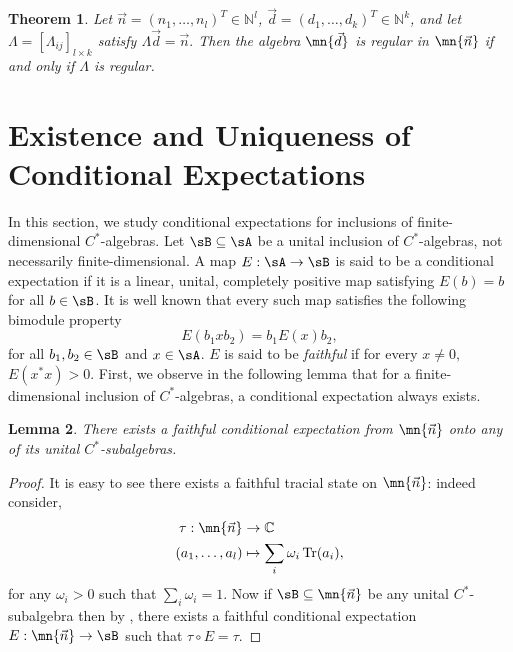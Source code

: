 \documentclass[12pt,a4paper]{amsart}
\theoremstyle{plain}
\newtheorem{theorem}{Theorem}[section]
\newtheorem{lem}[theorem]{Lemma}
\theoremstyle{definition}
\theoremstyle{remark}
\numberwithin{equation}{section}
\theoremstyle{ser}
\theoremstyle{serr}
\theoremstyle{ser}
\theoremstyle{ser}
\theoremstyle{collabquestion}
\newcommand{\C}{\mathbb{C}}
\newcommand{\<}{\langle}
\renewcommand{\>}{\rangle}
\begin{document}
\begin{theorem}\cite[Theorem 5.11]{BGK2026}\label{thm:regularity_char}
    Let $\vec{n} = (n_1,\dots,n_l)^T\in\mathbb{N}^l$, $\vec{d}=(d_1,\dots,d_k)^T\in\mathbb{N}^k$, and let $\Lambda=[\Lambda_{ij}]_{l\times k}$ satisfy $\Lambda\vec{d}=\vec{n}.$
Then the algebra $\mn{\vec{d}}$ is regular in $\mn{\vec{n}}$ if and only if $\Lambda$ is regular.
\end{theorem}

    \section{Existence and Uniqueness of Conditional Expectations}
    \label{sec:cond_exp}


In this section, we study conditional expectations for inclusions of finite-dimensional $C^*$-algebras. Let $\sB \subseteq \sA$ be a unital inclusion of $C^*$-algebras, not necessarily finite-dimensional. A map $E:\sA \to \sB$ is said to be a conditional expectation if it is a linear, unital, completely positive map satisfying $E(b)=b$ for all $b\in \sB$. It is well known that every such map satisfies the following bimodule property
\[
E(b_1xb_2)=b_1E(x)b_2,
\]
for all $b_1,b_2 \in \sB$ and $x\in \sA$. $E$ is said to be \emph{faithful} if for every $x\neq 0,$ $E(x^*x)>0$. First, we observe in the following lemma that for a finite-dimensional inclusion of $C^*$-algebras, a conditional expectation always exists.

\begin{lem}\label{lem:faithful_exp}
 There exists a faithful conditional expectation from $\mn{\vec{n}}$ onto any of its unital $C^*$-subalgebras. 
\end{lem}
\begin{proof}
    It is easy to see there exists a faithful tracial state on $\mn{\vec{n}}$: indeed consider,
    \begin{align*}
        \tau:\mn{\vec{n}} &\to \C \\   
        (a_1, \dots, a_l)&\mapsto \sum_{i} \omega_i\, \textrm{Tr}(a_i),
    \end{align*}
    for any $\omega_i>0$ such that $\sum_i \omega_i = 1.$ Now if $\sB\subseteq \mn{\vec{n}}$ be any unital $C^*$-subalgebra then by \cite[Proposition V.2.36]{takesaki79}, there exists a faithful conditional expectation $E:\mn{\vec{n}} \to \sB$ such that $\tau \circ E = \tau$.
\end{proof}
\end{document}
